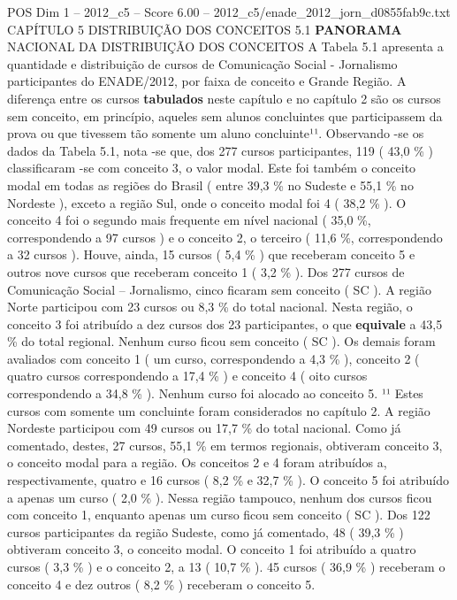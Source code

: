 \begin{textsample}{POS Dim 1 – 2012\_c5 – Score 6.00 – 2012\_c5/enade\_2012\_jorn\_d0855fab9c.txt}  \label{ex:f1_pos_115}
CAPÍTULO 5 DISTRIBUIÇÃO DOS CONCEITOS 5.1 \textbf{PANORAMA} NACIONAL DA DISTRIBUIÇÃO DOS CONCEITOS A Tabela 5.1 apresenta a quantidade e distribuição de cursos de Comunicação Social - Jornalismo participantes do ENADE/2012, por faixa de conceito e Grande Região.
A diferença entre os cursos \textbf{tabulados} neste capítulo e no capítulo 2 são os cursos sem conceito, em princípio, aqueles sem alunos concluintes que participassem da prova ou que tivessem tão somente um aluno concluinte¹¹.
Observando -se os dados da Tabela 5.1, nota -se que, dos 277 cursos participantes, 119 ( 43,0 \% ) classificaram -se com conceito 3, o valor modal.
Este foi também o conceito modal em todas as regiões do Brasil ( entre 39,3 \% no Sudeste e 55,1 \% no Nordeste ), exceto a região Sul, onde o conceito modal foi 4 ( 38,2 \% ).
O conceito 4 foi o segundo mais frequente em nível nacional ( 35,0 \%, correspondendo a 97 cursos ) e o conceito 2, o terceiro ( 11,6 \%, correspondendo a 32 cursos ).
Houve, ainda, 15 cursos ( 5,4 \% ) que receberam conceito 5 e outros nove cursos que receberam conceito 1 ( 3,2 \% ).
Dos 277 cursos de Comunicação Social – Jornalismo, cinco ficaram sem conceito ( SC ).
A região Norte participou com 23 cursos ou 8,3 \% do total nacional.
Nesta região, o conceito 3 foi atribuído a dez cursos dos 23 participantes, o que \textbf{equivale} a 43,5 \% do total regional.
Nenhum curso ficou sem conceito ( SC ).
Os demais foram avaliados com conceito 1 ( um curso, correspondendo a 4,3 \% ), conceito 2 ( quatro cursos correspondendo a 17,4 \% ) e conceito 4 ( oito cursos correspondendo a 34,8 \% ).
Nenhum curso foi alocado ao conceito 5. ¹¹ Estes cursos com somente um concluinte foram considerados no capítulo 2.
A região Nordeste participou com 49 cursos ou 17,7 \% do total nacional.
Como já comentado, destes, 27 cursos, 55,1 \% em termos regionais, obtiveram conceito 3, o conceito modal para a região.
Os conceitos 2 e 4 foram atribuídos a, respectivamente, quatro e 16 cursos ( 8,2 \% e 32,7 \% ).
O conceito 5 foi atribuído a apenas um curso ( 2,0 \% ).
Nessa região tampouco, nenhum dos cursos ficou com conceito 1, enquanto apenas um curso ficou sem conceito ( SC ).
Dos 122 cursos participantes da região Sudeste, como já comentado, 48 ( 39,3 \% ) obtiveram conceito 3, o conceito modal.
O conceito 1 foi atribuído a quatro cursos ( 3,3 \% ) e o conceito 2, a 13 ( 10,7 \% ). 45 cursos ( 36,9 \% ) receberam o conceito 4 e dez outros ( 8,2 \% ) receberam o conceito 5.

\end{textsample}
